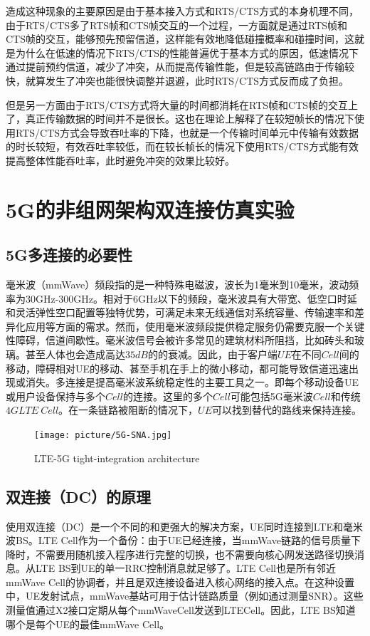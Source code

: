 \documentclass{article}
\begin{document}
造成这种现象的主要原因是由于基本接入方式和RTS/CTS方式的本身机理不同，由于RTS/CTS多了RTS帧和CTS帧交互的一个过程，一方面就是通过RTS帧和CTS帧的交互，能够预先预留信道，这样能有效地降低碰撞概率和碰撞时间，这就是为什么在低速的情况下RTS/CTS的性能普遍优于基本方式的原因，低速情况下通过提前预约信道，减少了冲突，从而提高传输性能，但是较高链路由于传输较快，就算发生了冲突也能很快调整并退避，此时RTS/CTS方式反而成了负担。

但是另一方面由于RTS/CTS方式将大量的时间都消耗在RTS帧和CTS帧的交互上了，真正传输数据的时间并不是很长。这也在理论上解释了在较短帧长的情况下使用RTS/CTS方式会导致吞吐率的下降，也就是一个传输时间单元中传输有效数据的时长较短，有效吞吐率较低，而在较长帧长的情况下使用RTS/CTS方式能有效提高整体性能吞吐率，此时避免冲突的效果比较好。

\section{5G的非组网架构双连接仿真实验}
\subsection{5G多连接的必要性}
毫米波（mmWave）频段指的是一种特殊电磁波，波长为1毫米到10毫米，波动频率为30GHz-300GHz。相对于6GHz以下的频段，毫米波具有大带宽、低空口时延和灵活弹性空口配置等独特优势，可满足未来无线通信对系统容量、传输速率和差异化应用等方面的需求。然而，使用毫米波频段提供稳定服务仍需要克服一个关键性障碍，信道间歇性。毫米波信号会被许多常见的建筑材料所阻挡，比如砖头和玻璃。甚至人体也会造成高达$35dB$的的衰减。因此，由于客户端$UE$在不同$Cell$间的移动，障碍相对UE的移动、甚至手机在手上的微小移动，都可能导致信道迅速出现或消失。多连接是提高毫米波系统稳定性的主要工具之一。即每个移动设备UE或用户设备保持与多个$Cell$的连接。这里的多个$Cell$可能包括5G毫米波$Cell$和传统$4GLTE \ Cell$。在一条链路被阻断的情况下，$UE$可以找到替代的路线来保持连接。
\begin{figure}[ht]
	\centering
	\texttt{[image: picture/5G-SNA.jpg]}
	\caption{LTE-5G tight-integration architecture}
	\label{fig:delay1}
\end{figure}
\subsection{双连接（DC）的原理}
使用双连接（DC）是一个不同的和更强大的解决方案，UE同时连接到LTE和毫米波BS。LTE Cell作为一个备份：由于UE已经连接，当mmWave链路的信号质量下降时，不需要用随机接入程序进行完整的切换，也不需要向核心网发送路径切换消息。从LTE BS到UE的单一RRC控制消息就足够了。LTE Cell也是所有邻近mmWave Cell的协调者，并且是双连接设备进入核心网络的接入点。在这种设置中，UE发射试点，mmWave基站可用于估计链路质量（例如通过测量SNR）。这些测量值通过X2接口定期从每个mmWaveCell发送到LTECell。因此，LTE BS知道哪个是每个UE的最佳mmWave Cell。
\end{document}
